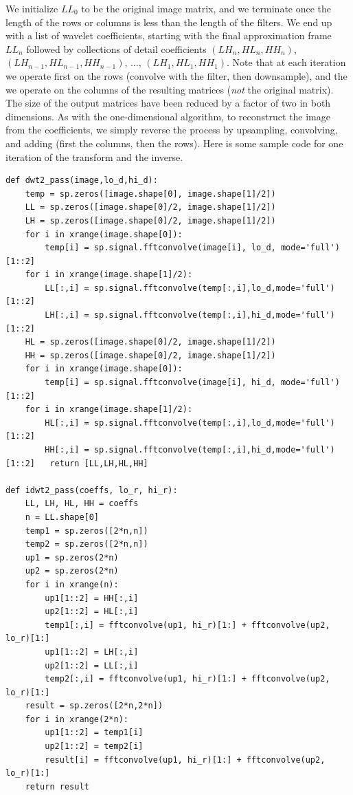 We initialize $LL_0$ to be the
original image matrix, and we terminate once the length of the rows or columns
is less than the length of the filters. We end up with a list of wavelet
coefficients, starting with the final approximation frame $LL_n$ followed by
collections of detail coefficients $(LH_n,HL_n,HH_n)$, $(LH_{n-1},HL_{n-1},HH_{n-1})$,
$\ldots$, $(LH_1,HL_1,HH_1)$. Note that at each iteration we operate first on the
rows (convolve with the filter, then downsample), and the we operate on the columns
of the resulting matrices (\emph{not} the original matrix). The size of the output
matrices have been reduced by a factor of two in both dimensions. As with the
one-dimensional algorithm, to reconstruct the image from the coefficients, we simply
reverse the process by upsampling, convolving, and adding (first the columns, then
the rows). Here is some sample code for one iteration of the transform and the inverse.

\begin{lstlisting}
def dwt2_pass(image,lo_d,hi_d):
	temp = sp.zeros([image.shape[0], image.shape[1]/2])
	LL = sp.zeros([image.shape[0]/2, image.shape[1]/2])
    LH = sp.zeros([image.shape[0]/2, image.shape[1]/2])    
	for i in xrange(image.shape[0]):
		temp[i] = sp.signal.fftconvolve(image[i], lo_d, mode='full')[1::2]    
	for i in xrange(image.shape[1]/2):    
		LL[:,i] = sp.signal.fftconvolve(temp[:,i],lo_d,mode='full')[1::2]    
        LH[:,i] = sp.signal.fftconvolve(temp[:,i],hi_d,mode='full')[1::2]  
	HL = sp.zeros([image.shape[0]/2, image.shape[1]/2])        
    HH = sp.zeros([image.shape[0]/2, image.shape[1]/2])        
	for i in xrange(image.shape[0]):        
		temp[i] = sp.signal.fftconvolve(image[i], hi_d, mode='full')[1::2]        
	for i in xrange(image.shape[1]/2):        
		HL[:,i] = sp.signal.fftconvolve(temp[:,i],lo_d,mode='full')[1::2]
        HH[:,i] = sp.signal.fftconvolve(temp[:,i],hi_d,mode='full')[1::2] 	return [LL,LH,HL,HH]

def idwt2_pass(coeffs, lo_r, hi_r):
	LL, LH, HL, HH = coeffs
    n = LL.shape[0]
	temp1 = sp.zeros([2*n,n])
	temp2 = sp.zeros([2*n,n])
	up1 = sp.zeros(2*n)
	up2 = sp.zeros(2*n) 
	for i in xrange(n):
		up1[1::2] = HH[:,i]
		up2[1::2] = HL[:,i]
		temp1[:,i] = fftconvolve(up1, hi_r)[1:] + fftconvolve(up2, lo_r)[1:]
		up1[1::2] = LH[:,i]
		up2[1::2] = LL[:,i]		
		temp2[:,i] = fftconvolve(up1, hi_r)[1:] + fftconvolve(up2, lo_r)[1:]
	result = sp.zeros([2*n,2*n])
	for i in xrange(2*n):
		up1[1::2] = temp1[i]
		up2[1::2] = temp2[i]
		result[i] = fftconvolve(up1, hi_r)[1:] + fftconvolve(up2, lo_r)[1:]
	return result
\end{lstlisting}

